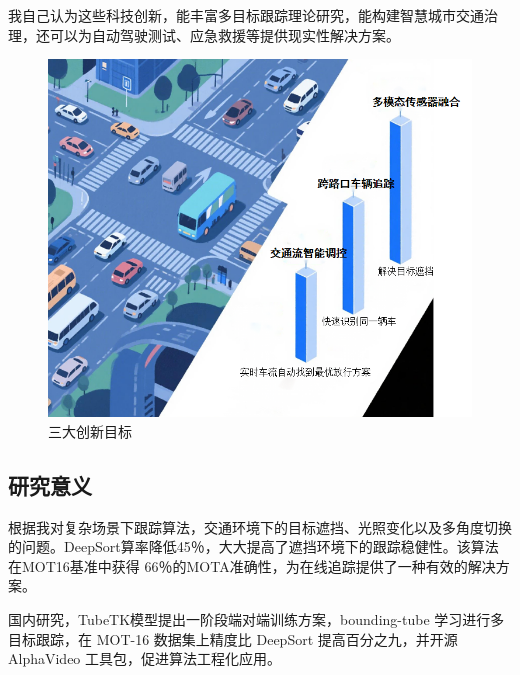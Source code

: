 我自己认为这些科技创新，能丰富多目标跟踪理论研究，能构建智慧城市交通治理，还可以为自动驾驶测试、应急救援等提供现实性解决方案。











\begin{figure}[htbp] %
	\centering
	\includegraphics[width=1\textwidth]{p25} %
	\caption{三大创新目标} %
	\label{fig:p25} %
\end{figure}













\subsection{研究意义}

根据我对复杂场景下跟踪算法，交通环境下的目标遮挡、光照变化以及多角度切换的问题。DeepSort算率降低45％，大大提高了遮挡环境下的跟踪稳健性。该算法在MOT16基准中获得 66％的MOTA准确性，为在线追踪提供了一种有效的解决方案。

国内研究，TubeTK模型提出一阶段端对端训练方案，bounding-tube 学习进行多目标跟踪，在 MOT-16 数据集上精度比 DeepSort 提高百分之九，并开源 AlphaVideo 工具包，促进算法工程化应用。

